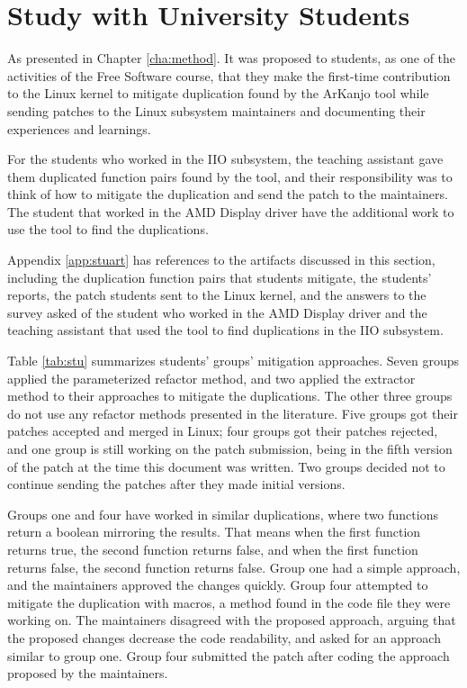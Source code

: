 \section{Study with University Students}

As presented in Chapter \ref{cha:method}. It was proposed to students, as one of the activities 
of the Free Software course, that they make the first-time contribution to the Linux kernel to 
mitigate duplication found by the ArKanjo tool while sending patches to the Linux subsystem 
maintainers and documenting their experiences and learnings.

For the students who worked in the IIO subsystem, the teaching assistant gave them duplicated 
function pairs 
found by the tool, and their responsibility was to think of how to mitigate the duplication 
and send the patch to the maintainers. The student that worked in the AMD Display driver 
have the additional work to use the tool to find the duplications.

Appendix \ref{app:stuart} has references to the artifacts discussed in this section, 
including the duplication function pairs that students mitigate, the students’ reports, 
the patch students sent to the Linux kernel, and the answers to the survey asked 
of the student who worked in the AMD Display driver and the teaching assistant that used 
the tool to find duplications in the IIO subsystem.



Table \ref{tab:stu} summarizes students' groups' mitigation approaches. Seven groups applied 
the parameterized refactor method, 
and two applied the extractor method to their approaches to mitigate the duplications. 
The other three groups do not use any refactor methods presented in the literature.  
Five groups got their patches accepted and merged in Linux; four groups got their patches rejected, 
and one group is still working on the patch submission, being in the fifth version of the patch at 
the time this document was written. Two groups decided not to continue sending the patches after 
they made initial versions.

Groups one and four have worked in similar duplications, where two functions return a 
boolean mirroring the results. That means when the first function returns true, the second 
function returns false, and when the first function returns false, the second function 
returns false. Group one had a simple approach, and the maintainers approved the changes quickly. 
Group four attempted to mitigate the duplication with macros, a method found in the code file 
they were working on. The maintainers disagreed with the proposed approach, arguing that the 
proposed changes decrease the code readability, and asked for an approach similar to group one. 
Group four submitted the patch after coding the approach proposed by the maintainers.

